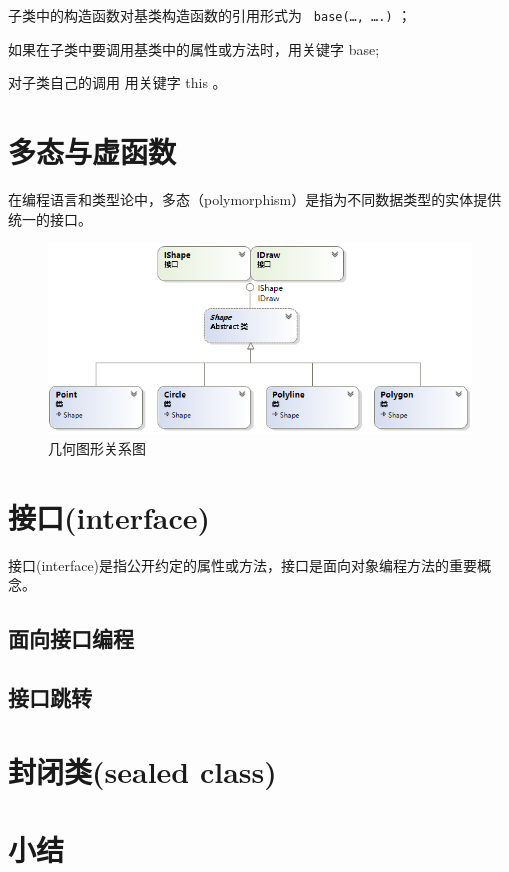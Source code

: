  子类中的构造函数对基类构造函数的引用形式为 \verb| base(…, ….)| ；
 
 如果在子类中要调用基类中的属性或方法时，用关键字 base;
 
 对子类自己的调用 用关键字 this 。
 



\section{多态与虚函数}
在编程语言和类型论中，多态（polymorphism）是指为不同数据类型的实体提供统一的接口。

\begin{figure}[htbp]
	\centering
	\includegraphics[scale=0.8]{chapter/csobject/graph.png}
	\caption{几何图形关系图}
	\label{fig:graph}
\end{figure}




\section{接口(interface)}
接口(interface)是指公开约定的属性或方法，接口是面向对象编程方法的重要概念。



\subsection{面向接口编程}

\subsection{接口跳转}


\section{封闭类(sealed class)}

\section{小结}